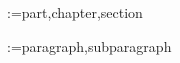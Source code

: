 \newcommand{\Phimax}{\Phi_{\mathrm{max}}}
\newcommand{\Phibar}{\overline{\Phi}}
\newcommand{\sigmabar}{\overline{\sigma}}
\newcommand{\fmax}{f_{\mathrm{max}}}
\newcommand{\fave}{f_{\mathrm{ave}}}
\newcommand{\vstar}{V^{*}}
\newcommand{\rstar}{r^{*}}
\newcommand{\rmax}{r_{\mathrm{g}}}
\newcommand{\rmin}{r_{\mathrm{s}}}
\newcommand{\vmax}{V_{\mathrm{g}}}
\newcommand{\vmin}{V_{\mathrm{s}}}

















\makeatletter
\newcommand{\crefnames}[3]{%
  \@for\next:=#1\do{%
    \expandafter\crefname\expandafter{\next}{#2}{#3}%
  }%
}
\makeatother

\setcounter{secnumdepth}{100}

\crefnames{part,chapter,section}{\S}{\S\S}
\crefnames{paragraph,subparagraph}{\P}{\P\P}







\newcommand{\myPart}[1]{%
  \part{#1}%
  \addtocontents{toc}{\vskip-6pt\par\noindent\protect\hrulefill\par}
}


\DeclareSIUnit{}
\DeclareSIUnit{}
